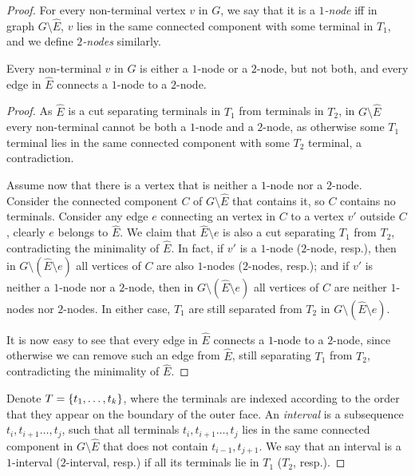 \begin{proof}
	For every non-terminal vertex $v$ in $G$, we say that it is a \emph{$1$-node} iff in graph $G\setminus \hat E$, $v$ lies in the same connected component with some terminal in $T_1$, and we define \emph{$2$-nodes} similarly.
	
	\begin{observation}
		\label{obs: 1 vs 2}
		Every non-terminal $v$ in $G$ is either a $1$-node or a $2$-node, but not both, and every edge in $\hat E$ connects a $1$-node to a $2$-node.
	\end{observation}
	\begin{proof}
		As $\hat E$ is a cut separating terminals in $T_1$ from terminals in $T_2$, in $G\setminus \hat E$ every non-terminal cannot be both a $1$-node and a $2$-node, as otherwise some $T_1$ terminal lies in the same connected component with some $T_2$ terminal, a contradiction.
		
		Assume now that there is a vertex that is neither a $1$-node nor a $2$-node. Consider the connected component $C$ of $G\setminus\hat E$ that contains it, so $C$ contains no terminals. Consider any edge $e$ connecting an vertex in $C$ to a vertex $v'$ outside $C$, clearly $e$ belongs to $\hat E$.
		We claim that $\hat E\setminus e$ is also a cut separating $T_1$ from $T_2$, contradicting the minimality of $\hat E$.
%		
		In fact, if $v'$ is a $1$-node ($2$-node, resp.), then in $G\setminus (\hat E\setminus e)$ all vertices of $C$ are also $1$-nodes ($2$-nodes, resp.); and if $v'$ is neither a $1$-node nor a $2$-node, then in $G\setminus (\hat E\setminus e)$ all vertices of $C$ are neither $1$-nodes nor $2$-nodes. In either case, $T_1$ are still separated from $T_2$ in $G\setminus (\hat E\setminus e)$.
		
		It is now easy to see that every edge in $\hat E$ connects a $1$-node to a $2$-node, since otherwise we can remove such an edge from $\hat E$, still separating $T_1$ from $T_2$, contradicting the minimality of $\hat E$.
	\end{proof}


	Denote $T=\left\{ t_1,\ldots,t_k \right\}$, where the terminals are indexed according to the order that they appear on the boundary of the outer face. An \emph{interval} is a subsequence $t_i,t_{i+1}\ldots,t_j$, such that all terminals $t_i,t_{i+1}\ldots,t_j$ lies in the same connected component in $G\setminus \hat E$ that does not contain $t_{i-1}, t_{j+1}$.
	We say that an interval is a $1$-interval ($2$-interval, resp.) if all its terminals lie in $T_1$ ($T_2$, resp.).
	

\end{proof}

